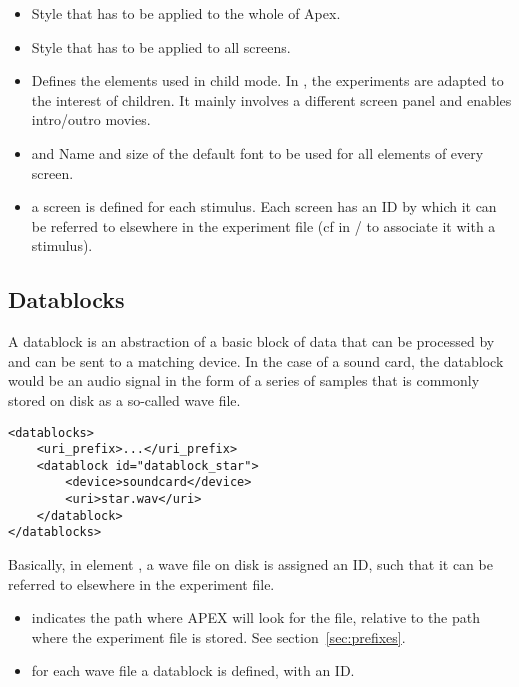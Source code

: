 \begin{itemize}
\item {} Style that has to be applied to the whole of Apex.

\item {} Style that has to be applied to all screens.

\item {} Defines the elements used in child mode. In , the experiments are adapted to the interest of children. It mainly involves a different screen panel and enables intro/outro movies.

\item {} and  Name and size of the default font to be used for all elements of every screen.

\item {} a screen is defined for each stimulus. Each
screen has an ID by which it can be referred to elsewhere in the
experiment file (cf in / to associate it with a stimulus).

\end{itemize}


\subsection{Datablocks}
\label{sec:datablocks}


A datablock is an abstraction of a basic block of data that can be
processed by \apex and can be sent to a matching device. In the
case of a sound card, the datablock would be an audio signal in
the form of a series of samples that is commonly stored on disk as
a so-called wave file.

\begin{lstlisting}
<datablocks>
    <uri_prefix>...</uri_prefix>
    <datablock id="datablock_star">
        <device>soundcard</device>
        <uri>star.wav</uri>
    </datablock>
</datablocks>
\end{lstlisting}

Basically, in element , a wave file on disk is
assigned an ID, such that it can be referred to elsewhere in the
experiment file. 

\begin{itemize}
\item {} indicates the path where APEX will look for the file, relative to the path where the experiment file is stored. See section~\ref{sec:prefixes}.

\item {} for each wave file a datablock is
defined, with an ID.
\end{itemize}

